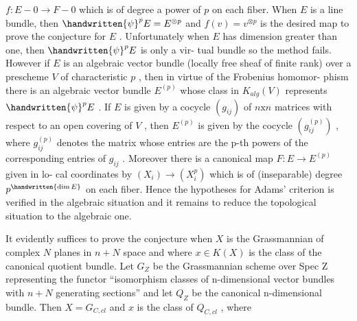 $f:E - 0 \rightarrow F - 0$ which is of degree a power of $p$ on each fiber.
When $E$ is a line bundle, then $\handwritten{\psi}^pE = E^{\otimes p}$ and $f(v) = v^{\otimes p}$ is
the desired map to prove the conjecture for $E$ . Unfortunately
when $E$ has dimension greater than one, then $\handwritten{\psi}^pE$ is only a vir-%
tual bundle so the method fails. However if $E$ is an algebraic
vector bundle (locally free sheaf of finite rank) over a prescheme
$V$ of characteristic $p$ , then in virtue of the Frobenius homomor-%
phism there is an algebraic vector bundle $E^{(p)}$ whose class in
$K_{alg}(V)$ represents $\handwritten{\psi}^pE$ .\textsuperscript{\handwritten{*}} If $E$ is given by a cocycle $(g_{ij})$ of
$n\mathrm{x}n$ matrices with respect to an open covering of $V$ , then $E^{(p)}$
is given by the cocycle $(g_{ij}^{(p)})$ , where $g_{ij}^{(p)}$ denotes the matrix
whose entries are the p-th powers of the corresponding entries of
$g_{ij}$ . Moreover there is a canonical map $F:E \rightarrow E^{(p)}$ given in lo-%
cal coordinates by $(X_i) \rightarrow (X_i^p)$ which is of (inseparable) degree
$p^{\handwritten{\dim E}}$ on each fiber. Hence the hypotheses for Adams' criterion is
verified in the algebraic situation and it remains to reduce the
topological situation to the algebraic one.

It evidently suffices to prove the conjecture when $X$ is the
Grassmannian of complex $N$ planes in $n + N$ space and where
$x \in K(X)$ is the class of the canonical quotient bundle. Let $G_Z$
be the Grassmannian scheme over Spec Z representing the functor
``isomorphism classes of n-dimensional vector bundles with $n + N$
generating sections'' and let $Q_Z$ be the canonical n-dimensional
bundle. Then $X = G_{C,cl}$ and $x$ is the class of $Q_{C,cl}$ , where




